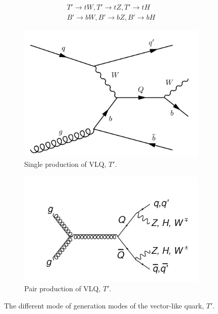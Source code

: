 \begin{equation*}\label{eq:label_1222}
\begin{split}
 T' \longrightarrow tW, T' \longrightarrow tZ, T' \longrightarrow tH  \\
   B' \longrightarrow bW, B' \longrightarrow bZ, B' \longrightarrow bH
\end{split}
\end{equation*}


\begin{figure}[H]
     \centering
     \begin{subfigure}[b]{0.47\textwidth}
         \centering
         \includegraphics[width=\textwidth]{figure_1/1.png}
         \caption{Single production of VLQ, $T'$.}
         \label{fig:yequalsx}
     \end{subfigure}
     \hfill
     \begin{subfigure}[b]{0.47\textwidth}
         \centering
         \includegraphics[width=\textwidth]{figure_1/2.png}
         \caption{Pair production of VLQ, $T'$.}
         \label{fig:threesinx}
     \end{subfigure}
     \hfill
        \caption{The different mode of generation modes of the vector-like quark, $T'$.}
        \label{fig:threeVLQgraphs}
\end{figure}
